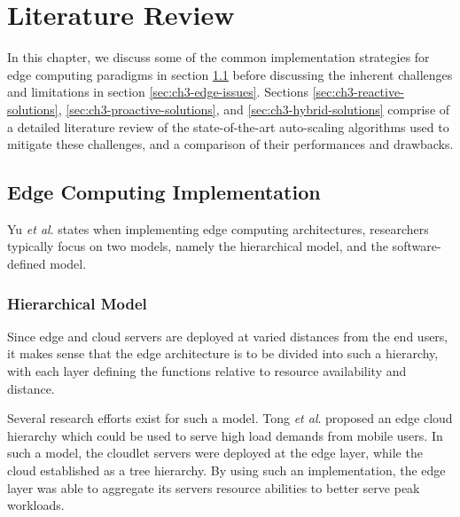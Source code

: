 \clearpage

\def\chaptertitle{Literature Review}

\lhead{\emph{\chaptertitle}}

\chapter{\chaptertitle}
\label{ch:lit-review}

In this chapter, we discuss some of the common implementation strategies for edge computing paradigms in section \ref{sec:ch3-edge-implementation} before discussing the inherent challenges and limitations in section \ref{sec:ch3-edge-issues}. Sections \ref{sec:ch3-reactive-solutions}, \ref{sec:ch3-proactive-solutions}, and \ref{sec:ch3-hybrid-solutions} comprise of a detailed literature review of the state-of-the-art auto-scaling algorithms used to mitigate these challenges, and a comparison of their performances and drawbacks.

\section{Edge Computing Implementation}
\label{sec:ch3-edge-implementation}

Yu \textit{et al}. \cite{yu2017survey} states when implementing edge computing architectures, researchers typically focus on two models, namely the hierarchical model, and the software-defined model.\par

\subsection{Hierarchical Model}
\label{subsec:ch3-hierarchical-model}

Since edge and cloud servers are deployed at varied distances from the end users, it makes sense that the edge architecture is to be divided into such a hierarchy, with each layer defining the functions relative to resource availability and distance.\par

Several research efforts exist for such a model. Tong \textit{et al}. \cite{tong2016hierarchical} proposed an edge cloud hierarchy which could be used to serve high load demands from mobile users. In such a model, the cloudlet servers were deployed at the edge layer, while the cloud established as a tree hierarchy. By using such an implementation, the edge layer was able to aggregate its servers resource abilities to better serve peak workloads.\par

